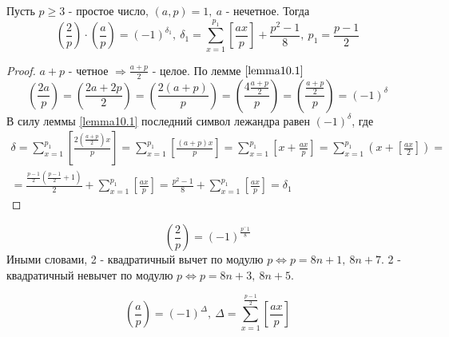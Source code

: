     \begin{lemma}\label{lemma10.2}
        Пусть $p\geq 3$ - простое число, $(a,p)=1,\ a$ - нечетное. Тогда
        \[(\frac{2}{p})\cdot(\frac{a}{p})=(-1)^{\delta_1},\ \delta_1=\sum\limits_{x=1}^{p_1}[\frac{ax}{p}]+\frac{p^2-1}{8},\ p_1=\frac{p-1}{2}\]
    \end{lemma} 
    \begin{proof}
        $a+p$ - четное $\Rightarrow \frac{a+p}{2}$ - целое. По лемме $\ref{lemma10.1}$
            \[(\frac{2a}{p})=(\frac{2a+2p}{2})=(\frac{2(a+p)}{p})=(\frac{4\frac{a+p}{2}}{p})=(\frac{\frac{a+p}{2}}{p})=(-1)^{\delta}\]
            В силу леммы \ref{lemma10.1} последний символ лежандра равен $(-1)^{\delta}$, где
            \begin{multline*}
            \delta=\sum\limits_{x=1}^{p_1}[\frac{2(\frac{a+p}{2})x}{p}]=\sum\limits_{x=1}^{p_1}[\frac{(a+p)x}{p}]=\sum\limits_{x=1}^{p_1}[x+\frac{ax}{p}]=\sum\limits_{x=1}^{p_1}(x+[\frac{ax}{2}])=\\=\frac{\frac{p-1}{2}(\frac{p-1}{2}+1)}{2}+\sum\limits_{x=1}^{p_1}[\frac{ax}{p}]=\frac{p^2-1}{8}+\sum\limits_{x=1}^{p_1}[\frac{ax}{p}]=\delta_1
        \end{multline*}
    \end{proof} 
    \begin{consequense}
        \[(\frac{2}{p})=(-1)^{\frac{p^-1}{8}}\] 
        Иными словами, 2 - квадратичный вычет по модулю $p \Leftrightarrow p=8n+1,\ 8n+7$. 2 - квадратичный невычет по модулю $p \Leftrightarrow p=8n+3,\ 8n+5$. 
    \end{consequense} 
    \begin{consequense}
        \[(\frac{a}{p})=(-1)^{\Delta},\ \Delta = \sum\limits_{x=1}^{\frac{p-1}{2}}[\frac{ax}{p}]\]
    \end{consequense} 
